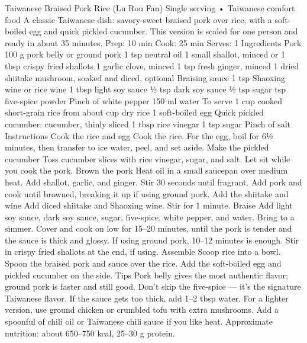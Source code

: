 Taiwanese Braised Pork Rice (Lu Rou Fan)  Single serving • Taiwanese comfort food A classic Taiwanese dish: savory-sweet braised pork over rice, with a soft-boiled egg and quick pickled cucumber. This version is scaled for one person and ready in about 35 minutes. Prep: 10 min Cook: 25 min Serves: 1 Ingredients Pork 100 g pork belly or ground pork 1 tsp neutral oil 1 small shallot, minced or 1 tbsp crispy fried shallots 1 garlic clove, minced 1 tsp fresh ginger, minced 1 dried shiitake mushroom, soaked and diced, optional Braising sauce 1 tsp Shaoxing wine or rice wine 1 tbsp light soy sauce ½ tsp dark soy sauce ½ tsp sugar  tsp five-spice powder Pinch of white pepper 150 ml water To serve 1 cup cooked short-grain rice from about  cup dry rice 1 soft-boiled egg Quick pickled cucumber:  cucumber, thinly sliced 1 tbsp rice vinegar 1 tsp sugar Pinch of salt Instructions Cook the rice and egg Cook the rice. For the egg, boil for 6½ minutes, then transfer to ice water, peel, and set aside. Make the pickled cucumber Toss cucumber slices with rice vinegar, sugar, and salt. Let sit while you cook the pork. Brown the pork Heat oil in a small saucepan over medium heat. Add shallot, garlic, and ginger. Stir 30 seconds until fragrant. Add pork and cook until browned, breaking it up if using ground pork. Add the shiitake and wine Add diced shiitake and Shaoxing wine. Stir for 1 minute. Braise Add light soy sauce, dark soy sauce, sugar, five-spice, white pepper, and water. Bring to a simmer. Cover and cook on low for 15–20 minutes, until the pork is tender and the sauce is thick and glossy. If using ground pork, 10–12 minutes is enough. Stir in crispy fried shallots at the end, if using. Assemble Scoop rice into a bowl. Spoon the braised pork and sauce over the rice. Add the soft-boiled egg and pickled cucumber on the side. Tips Pork belly gives the most authentic flavor; ground pork is faster and still good. Don’t skip the five-spice — it’s the signature Taiwanese flavor. If the sauce gets too thick, add 1–2 tbsp water. For a lighter version, use ground chicken or crumbled tofu with extra mushrooms. Add a spoonful of chili oil or Taiwanese chili sauce if you like heat. Approximate nutrition: about 650–750 kcal, 25–30 g protein.
\par

